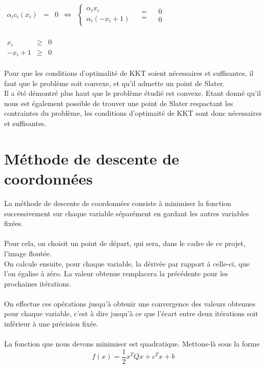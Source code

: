 \documentclass[12pt, a4paper]{report}
\begin{document}
\begin{center}
$\begin{array}{rclcrll}
\alpha_i c_i(x_i) & = & 0 & \Leftrightarrow & \left\{\begin{array}{l} \alpha_i x_i \\ \alpha_i(- x_i +1)\end{array}\right. & \begin{array}{c} = \\ = \end{array} & \begin{array}{l} 0 \\ 0 \end{array}\\
\end{array}$
\end{center}

\begin{center}
$\begin{array}{rcl}
x_i & \geq & 0 \\
-x_i + 1 & \geq & 0 \\
\end{array}$
\end{center}
\noindent
Pour que les conditions d'optimalité de KKT soient nécessaires et suffisantes, il faut que le problème soit convexe, et qu'il admette un point de Slater.\\
Il a été démontré plus haut que le problème étudié est convexe. Etant donné qu'il nous est également possible de trouver une point de Slater respactant les contraintes du problème, les conditions d'optimaité de KKT sont donc nécessaires et suffisantes.
 
\section{Méthode de descente de coordonnées}
La méthode de descente de coordonnées consiste à minimiser la fonction successivement sur chaque variable séparément en gardant les autres variables fixées.\\
\\Pour cela, on choisit un point de départ, qui sera, dans le cadre de ce projet, l'image floutée.\\
On calcule ensuite, pour chaque variable, la dérivée par rapport à celle-ci, que l'on égalise à zéro. La valeur obtenue remplacera la précédente pour les prochaines itérations. \\
\\On effectue ces opérations jusqu'à obtenir une convergence des valeurs obtenues pour chaque variable, c'est à dire jusqu'à ce que l'écart entre deux itérations soit inférieur à une précision fixée. \\
\\La fonction que nous devons minimiser est quadratique. Mettons-là sous la forme \[f(x) = \dfrac{1}{2}x^TQx + c^Tx + b\]
\end{document}
